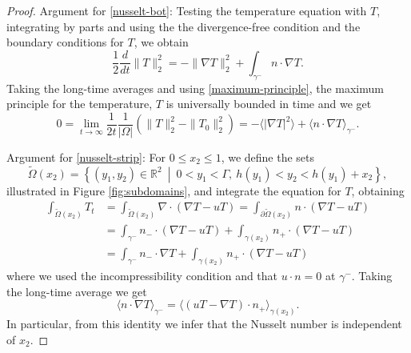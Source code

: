 \documentclass{article}
\theoremstyle{definition}
\theoremstyle{definition}
\newcommand{\gminus}{\gamma^-}
\newcommand{\la}{\langle}
\newcommand{\ra}{\rangle}
\begin{document}
\begin{proof}
Argument for \eqref{nusselt-bot}: Testing the temperature equation with $T$, integrating by parts and using the the divergence-free condition and the boundary conditions for $T$, we obtain
\begin{equation*}
    \frac{1}{2}\frac{d}{dt}\|T\|_2^ 2 = -\|\nabla T\|_2^2 + \int_{\gamma^-} n \cdot \nabla T.
\end{equation*}
Taking the long-time averages and using \eqref{maximum-principle}, the maximum principle for the temperature, $T$ is universally bounded in time and we get
\begin{equation*}
    0=\lim_{t\to\infty} \frac{1}{2t} \frac{1}{|\Omega|} \left(\|T\|_2^2-\|T_0\|_2^2\right) 
    =-\langle |\nabla T|^2\rangle +\langle n\cdot \nabla T\rangle_{\gamma^-}.
\end{equation*}

Argument for \eqref{nusselt-strip}: For $0\leq x_2\leq 1$, we define the sets 
\begin{equation}
    \label{definition_OmegaTilde}
            \tilde\Omega(x_2)=\left\lbrace (y_1,y_2)\in \mathbb{R}^2\ \middle \vert\ 0<y_1<\Gamma,\ h(y_1)<y_2<h(y_1)+x_2 \right\rbrace,
\end{equation}
illustrated in Figure \ref{fig:subdomains}, and integrate the equation for $T$, obtaining
 \begin{align*}
            \int_{\tilde\Omega(x_2)} T_t &= \int_{\tilde\Omega(x_2)} \nabla \cdot(\nabla T -uT) 
            =\int_{\partial\tilde\Omega(x_2)} n\cdot (\nabla T - u T)\\
            &=\int_{\gamma^-} n_-\cdot (\nabla T - u T)+\int_{\gamma(x_2)} n_+\cdot (\nabla T - u T)\\
            &=\int_{\gamma^-} n_-\cdot \nabla T +\int_{\gamma(x_2)} n_+\cdot (\nabla T - u T)
\end{align*}
where we used the incompressibility condition and that $u\cdot n=0$ at $\gminus$.
Taking the long-time average we get
\begin{equation*}
    \langle n\cdot \nabla T\rangle_{\gamma^-}=\la (uT-\nabla T)\cdot n_+\ra_{\gamma(x_2)}.    
\end{equation*}
In particular, from this identity we infer that the Nusselt number is independent of $x_2$.




\end{proof}
\end{document}
